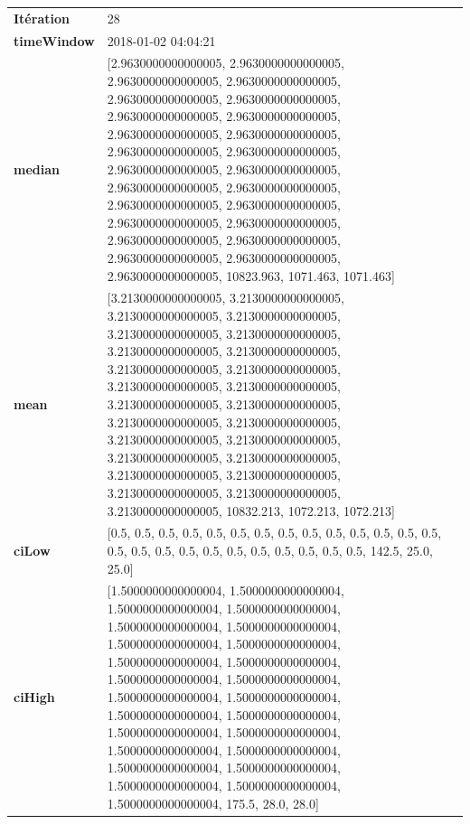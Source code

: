 \begin{table}[H]
	\centering
	\begin{tabularx}{\textwidth}{lX}
		\textbf{Itération}& 28\\
		\textbf{timeWindow}& 2018-01-02 04:04:21 \\
		
		\textbf{median}& [2.9630000000000005, 2.9630000000000005, 2.9630000000000005, 2.9630000000000005, 2.9630000000000005, 2.9630000000000005, 2.9630000000000005, 2.9630000000000005, 2.9630000000000005, 2.9630000000000005, 2.9630000000000005, 2.9630000000000005, 2.9630000000000005, 2.9630000000000005, 2.9630000000000005, 2.9630000000000005, 2.9630000000000005, 2.9630000000000005, 2.9630000000000005, 2.9630000000000005, 2.9630000000000005, 2.9630000000000005, 2.9630000000000005, 2.9630000000000005, 2.9630000000000005, 10823.963, 1071.463, 1071.463]\\ 
		\textbf{mean} & [3.2130000000000005, 3.2130000000000005, 3.2130000000000005, 3.2130000000000005, 3.2130000000000005, 3.2130000000000005, 3.2130000000000005, 3.2130000000000005, 3.2130000000000005, 3.2130000000000005, 3.2130000000000005, 3.2130000000000005, 3.2130000000000005, 3.2130000000000005, 3.2130000000000005, 3.2130000000000005, 3.2130000000000005, 3.2130000000000005, 3.2130000000000005, 3.2130000000000005, 3.2130000000000005, 3.2130000000000005, 3.2130000000000005, 3.2130000000000005, 3.2130000000000005, 10832.213, 1072.213, 1072.213]\\ 
		\textbf{ciLow}& [0.5, 0.5, 0.5, 0.5, 0.5, 0.5, 0.5, 0.5, 0.5, 0.5, 0.5, 0.5, 0.5, 0.5, 0.5, 0.5, 0.5, 0.5, 0.5, 0.5, 0.5, 0.5, 0.5, 0.5, 0.5, 142.5, 25.0, 25.0] \\
		\textbf{ciHigh}& [1.5000000000000004, 1.5000000000000004, 1.5000000000000004, 1.5000000000000004, 1.5000000000000004, 1.5000000000000004, 1.5000000000000004, 1.5000000000000004, 1.5000000000000004, 1.5000000000000004, 1.5000000000000004, 1.5000000000000004, 1.5000000000000004, 1.5000000000000004, 1.5000000000000004, 1.5000000000000004, 1.5000000000000004, 1.5000000000000004, 1.5000000000000004, 1.5000000000000004, 1.5000000000000004, 1.5000000000000004, 1.5000000000000004, 1.5000000000000004, 1.5000000000000004, 175.5, 28.0, 28.0] \\
		
					\end{tabularx} 
				\end{table}
				
